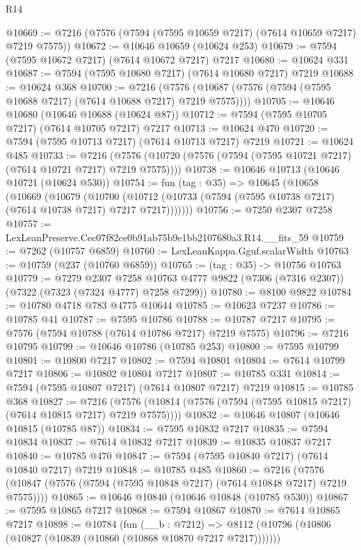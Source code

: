 \begin{lexlean}{R14}
\begin{coremodule}
@10669 := @7216 (@7576 (@7594 (@7595 @10659 @7217) (@7614 @10659 @7217) @7219 @7575))
@10672 := @10646 @10659 (@10624 @253)
@10679 := @7594 (@7595 @10672 @7217) (@7614 @10672 @7217) @7217
@10680 := @10624 @331
@10687 := @7594 (@7595 @10680 @7217) (@7614 @10680 @7217) @7219
@10688 := @10624 @368
@10700 := @7216
    (@7576 (@10687 (@7576 (@7594 (@7595 @10688 @7217) (@7614 @10688 @7217) @7219 @7575))))
@10705 := @10646 @10680 (@10646 @10688 (@10624 @87))
@10712 := @7594 (@7595 @10705 @7217) (@7614 @10705 @7217) @7217
@10713 := @10624 @470
@10720 := @7594 (@7595 @10713 @7217) (@7614 @10713 @7217) @7219
@10721 := @10624 @485
@10733 := @7216
    (@7576 (@10720 (@7576 (@7594 (@7595 @10721 @7217) (@7614 @10721 @7217) @7219 @7575))))
@10738 := @10646 @10713 (@10646 @10721 (@10624 @530))
@10754 := fun (tag : @35) =>
  @10645
    (@10658
      (@10669
        (@10679
          (@10700
            (@10712 (@10733 (@7594 (@7595 @10738 @7217) (@7614 @10738 @7217) @7217 @7217)))))))
@10756 := @7250 @2307 @7258
@10757 := LexLeanPreserve.Cec07f82ce0b91ab75b9e1bb2107680a3.R14.__fits_59
@10759 := @7262 (@10757 @6859)
@10760 := LexLeanKappa.Gguf.scalarWidth
@10763 := @10759 (@237 (@10760 @6859))
@10765 := (tag : @35) -> @10756 @10763
@10779 := @7279
    @2307
    @7258
    @10763
    @4777
    @9822
    (@7306 (@7316 @2307))
    (@7322 (@7323 (@7324 @4777) @7258 @7299))
@10780 := @8100 @9822
@10784 := @10780 @4718 @783 @4775 @10644
@10785 := @10623 @7237
@10786 := @10785 @41
@10787 := @7595 @10786
@10788 := @10787 @7217
@10795 := @7576 (@7594 @10788 (@7614 @10786 @7217) @7219 @7575)
@10796 := @7216 @10795
@10799 := @10646 @10786 (@10785 @253)
@10800 := @7595 @10799
@10801 := @10800 @7217
@10802 := @7594 @10801
@10804 := @7614 @10799 @7217
@10806 := @10802 @10804 @7217
@10807 := @10785 @331
@10814 := @7594 (@7595 @10807 @7217) (@7614 @10807 @7217) @7219
@10815 := @10785 @368
@10827 := @7216
    (@7576 (@10814 (@7576 (@7594 (@7595 @10815 @7217) (@7614 @10815 @7217) @7219 @7575))))
@10832 := @10646 @10807 (@10646 @10815 (@10785 @87))
@10834 := @7595 @10832 @7217
@10835 := @7594 @10834
@10837 := @7614 @10832 @7217
@10839 := @10835 @10837 @7217
@10840 := @10785 @470
@10847 := @7594 (@7595 @10840 @7217) (@7614 @10840 @7217) @7219
@10848 := @10785 @485
@10860 := @7216
    (@7576 (@10847 (@7576 (@7594 (@7595 @10848 @7217) (@7614 @10848 @7217) @7219 @7575))))
@10865 := @10646 @10840 (@10646 @10848 (@10785 @530))
@10867 := @7595 @10865 @7217
@10868 := @7594 @10867
@10870 := @7614 @10865 @7217
@10898 := @10784
    (fun (__b : @7212) =>
    @8112 (@10796 (@10806 (@10827 (@10839 (@10860 (@10868 @10870 @7217 @7217)))))))

\end{coremodule}
\end{lexlean}
